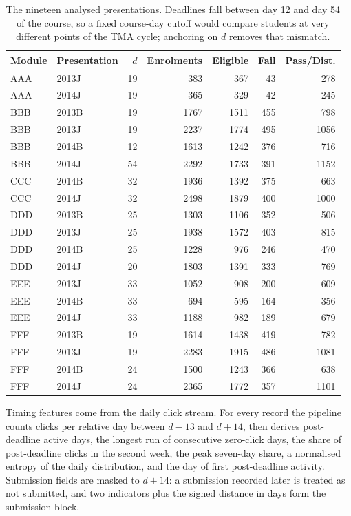 \documentclass[11pt]{article}
\begin{document}
\begin{table}[t]
\centering
\scriptsize\setlength{\tabcolsep}{3pt}
\begin{tabular}{llrrrrr}
\toprule
Module & Presentation & $d$ & Enrolments & Eligible & Fail & Pass/Dist. \\
\midrule
AAA & 2013J & 19 & 383 & 367 & 43 & 278 \\
AAA & 2014J & 19 & 365 & 329 & 42 & 245 \\
BBB & 2013B & 19 & 1767 & 1511 & 455 & 798 \\
BBB & 2013J & 19 & 2237 & 1774 & 495 & 1056 \\
BBB & 2014B & 12 & 1613 & 1242 & 376 & 716 \\
BBB & 2014J & 54 & 2292 & 1733 & 391 & 1152 \\
CCC & 2014B & 32 & 1936 & 1392 & 375 & 663 \\
CCC & 2014J & 32 & 2498 & 1879 & 400 & 1000 \\
DDD & 2013B & 25 & 1303 & 1106 & 352 & 506 \\
DDD & 2013J & 25 & 1938 & 1572 & 403 & 815 \\
DDD & 2014B & 25 & 1228 & 976 & 246 & 470 \\
DDD & 2014J & 20 & 1803 & 1391 & 333 & 769 \\
EEE & 2013J & 33 & 1052 & 908 & 200 & 609 \\
EEE & 2014B & 33 & 694 & 595 & 164 & 356 \\
EEE & 2014J & 33 & 1188 & 982 & 189 & 679 \\
FFF & 2013B & 19 & 1614 & 1438 & 419 & 782 \\
FFF & 2013J & 19 & 2283 & 1915 & 486 & 1081 \\
FFF & 2014B & 24 & 1500 & 1243 & 366 & 638 \\
FFF & 2014J & 24 & 2365 & 1772 & 357 & 1101 \\
\bottomrule
\end{tabular}
\caption{The nineteen analysed presentations. Deadlines fall between day 12 and day 54 of the course, so a fixed course-day cutoff would compare students at very different points of the TMA cycle; anchoring on $d$ removes that mismatch.}
\label{tab:presentations}
\end{table}
Timing features come from the daily click stream. For every record the pipeline counts clicks per relative day between $d-13$ and $d+14$, then derives post-deadline active days, the longest run of consecutive zero-click days, the share of post-deadline clicks in the second week, the peak seven-day share, a normalised entropy of the daily distribution, and the day of first post-deadline activity. Submission fields are masked to $d+14$: a submission recorded later is treated as not submitted, and two indicators plus the signed distance in days form the submission block.
\end{document}
